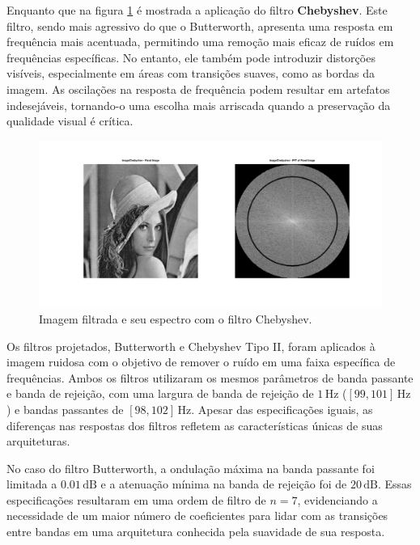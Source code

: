 Enquanto que na figura \ref{fig:image_chebyshev} é mostrada a aplicação do filtro \textbf{Chebyshev}. Este filtro, sendo mais agressivo do que o Butterworth, apresenta uma resposta em frequência mais acentuada, permitindo uma remoção mais eficaz de ruídos em frequências específicas. No entanto, ele também pode introduzir distorções visíveis, especialmente em áreas com transições suaves, como as bordas da imagem. As oscilações na resposta de frequência podem resultar em artefatos indesejáveis, tornando-o uma escolha mais arriscada quando a preservação da qualidade visual é crítica.

\begin{figure}[H]
    \centering
    \includegraphics[width=1\linewidth]{03_results/assets/image_chebyshev.png}
    \caption{Imagem filtrada e seu espectro com o filtro Chebyshev.}
    \label{fig:image_chebyshev}
\end{figure}

Os filtros projetados, Butterworth e Chebyshev Tipo II, foram aplicados à imagem ruidosa com o objetivo de remover o ruído em uma faixa específica de frequências. Ambos os filtros utilizaram os mesmos parâmetros de banda passante e banda de rejeição, com uma largura de banda de rejeição de $1 \, \text{Hz}$ ($[99, 101] \, \text{Hz}$) e bandas passantes de $[98, 102] \, \text{Hz}$. Apesar das especificações iguais, as diferenças nas respostas dos filtros refletem as características únicas de suas arquiteturas.

No caso do filtro Butterworth, a ondulação máxima na banda passante foi limitada a $0.01 \, \text{dB}$ e a atenuação mínima na banda de rejeição foi de $20 \, \text{dB}$. Essas especificações resultaram em uma ordem de filtro de $n = 7$, evidenciando a necessidade de um maior número de coeficientes para lidar com as transições entre bandas em uma arquitetura conhecida pela suavidade de sua resposta.

